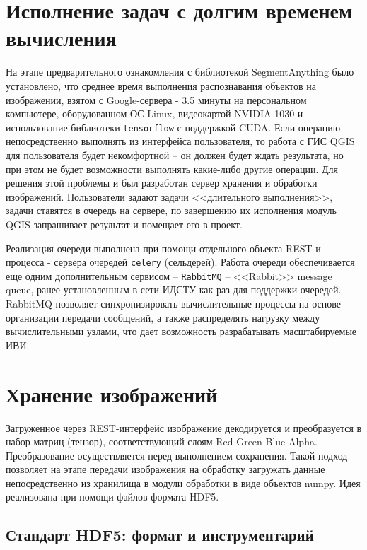 \documentclass[732,fontsize=14pt,final]{studrep}
\begin{document}
\section{Исполнение задач с долгим временем вычисления}

На этапе предварительного ознакомления с библиотекой SegmentAnything было установлено, что среднее время выполнения распознавания объектов на изображении, взятом с Google-сервера - 3.5 минуты на персональном компьютере, оборудованном ОС Linux, видеокартой NVIDIA 1030 и использование библиотеки \verb|tensorflow| с поддержкой CUDA. Если операцию непосредственно выполнять из интерфейса пользователя, то работа с ГИС QGIS для пользователя будет некомфортной -- он должен будет ждать результата, но при этом не будет возможности выполнять какие-либо другие операции. Для решения этой проблемы и был разработан сервер хранения и обработки изображений. Пользователи задают задачи <<длительного выполнения>>, задачи ставятся в очередь на сервере, по завершению их исполнения модуль QGIS запрашивает результат и помещает его в проект.

Реализация очереди выполнена при помощи отдельного объекта REST и процесса - сервера очередей \verb|celery| (сельдерей). Работа очереди обеспечивается еще одним дополнительным сервисом -- \verb|RabbitMQ| -- <<Rabbit>> message queue, ранее установленным в сети ИДСТУ как раз для поддержки очередей. RabbitMQ позволяет синхронизировать вычислительные процессы на основе организации передачи сообщений, а также распределять нагрузку между вычислительными узлами, что дает возможность разрабатывать масштабируемые ИВИ. 

\section{Хранение изображений}

Загруженное через REST-интерфейс изображение декодируется и преобразуется в набор матриц (тензор), соответствующий слоям Red-Green-Blue-Alpha. Преобразование осуществляется перед выполнением сохранения. Такой подход позволяет на этапе передачи изображения на обработку загружать данные непосредственно из хранилища в модули обработки в виде объектов numpy. Идея реализована при помощи файлов формата HDF5.

\subsection{Стандарт HDF5: формат и инструментарий}
\end{document}
